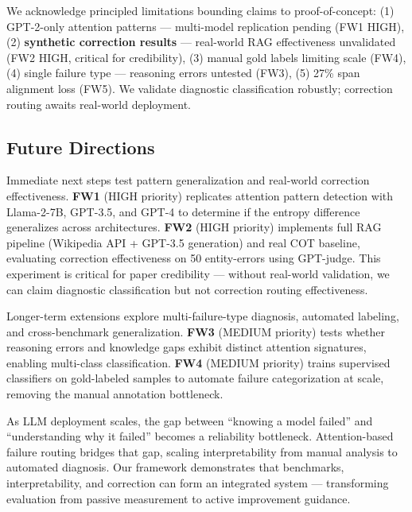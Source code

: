 We acknowledge principled limitations bounding claims to proof-of-concept: (1) GPT-2-only attention patterns --- multi-model replication pending (FW1 HIGH), (2) \textbf{synthetic correction results} --- real-world RAG effectiveness unvalidated (FW2 HIGH, critical for credibility), (3) manual gold labels limiting scale (FW4), (4) single failure type --- reasoning errors untested (FW3), (5) 27\% span alignment loss (FW5). We validate diagnostic classification robustly; correction routing awaits real-world deployment.

\subsection{Future Directions}

Immediate next steps test pattern generalization and real-world correction effectiveness. \textbf{FW1} (HIGH priority) replicates attention pattern detection with Llama-2-7B, GPT-3.5, and GPT-4 to determine if the entropy difference generalizes across architectures. \textbf{FW2} (HIGH priority) implements full RAG pipeline (Wikipedia API + GPT-3.5 generation) and real COT baseline, evaluating correction effectiveness on 50 entity-errors using GPT-judge. This experiment is critical for paper credibility --- without real-world validation, we can claim diagnostic classification but not correction routing effectiveness.

Longer-term extensions explore multi-failure-type diagnosis, automated labeling, and cross-benchmark generalization. \textbf{FW3} (MEDIUM priority) tests whether reasoning errors and knowledge gaps exhibit distinct attention signatures, enabling multi-class classification. \textbf{FW4} (MEDIUM priority) trains supervised classifiers on gold-labeled samples to automate failure categorization at scale, removing the manual annotation bottleneck.

As LLM deployment scales, the gap between ``knowing a model failed'' and ``understanding why it failed'' becomes a reliability bottleneck. Attention-based failure routing bridges that gap, scaling interpretability from manual analysis to automated diagnosis. Our framework demonstrates that benchmarks, interpretability, and correction can form an integrated system --- transforming evaluation from passive measurement to active improvement guidance.
